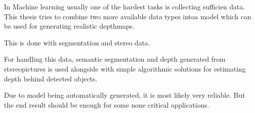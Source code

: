 In Machine learning usually one of the hardest tasks is collecting sufficien data.
This thesis tries to combine two more available data types intoa model which can be used for generating realistic depthmaps.

This is done with segmentation and stereo data.

For handling this data, semantic segmentation and depth generated from stereopictures is used
alongside with simple algorithmic solutions for estimating depth behind detected objects.

Due to model being automatically generated, it is most likely very reliable.
But the end result should be enough for some none critical applications.
